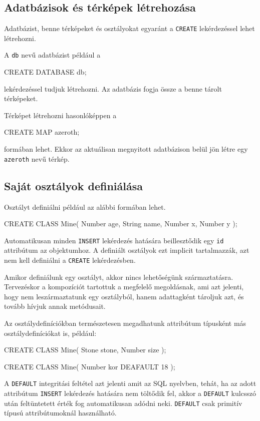 \subsection{Adatbázisok és térképek létrehozása}

Adatbázist, benne térképeket és osztályokat egyaránt a \texttt{CREATE} lekérdezéssel lehet létrehozni.

A \texttt{db} nevű adatbázist például a
\begin{sql}
CREATE DATABASE db;
\end{sql}
lekérdezéssel tudjuk létrehozni. Az adatbázis fogja össze a benne tárolt térképeket. 

Térképet létrehozni hasonlóképpen a
\begin{sql}
CREATE MAP azeroth;
\end{sql}
formában lehet. Ekkor az aktuálisan megnyitott adatbázison belül jön létre egy \texttt{azeroth} nevű térkép.

\subsection{Saját osztályok definiálása}

Osztályt definiálni például az alábbi formában lehet.
\begin{sql}
CREATE CLASS Mine(
    Number age,
    String name,
    Number x,
    Number y
); 
\end{sql}
Automatikusan minden \texttt{INSERT} lekérdezés hatására beillesztődik egy \texttt{id} attribútum az objektumhoz. A definiált osztályok ezt implicit tartalmazzák, azt nem kell definiálni a \texttt{CREATE} lekérdezésben.

Amikor definiálunk egy osztályt, akkor nincs lehetőségünk származtatásra. Tervezéskor a kompozíciót tartottuk a megfelelő megoldásnak, ami azt jelenti, hogy nem leszármaztatunk egy osztályból, hanem adattagként tároljuk azt, és tovább hívjuk annak metódusait.

Az osztálydefiníciókban természetesen megadhatunk attribútum típusként más osztálydefiníciókat is, például:
\begin{sql}
CREATE CLASS Mine(
    Stone stone,
    Number size
);

CREATE CLASS Mine(
	Number kor DEAFAULT 18
);
\end{sql}

A \texttt{DEFAULT} integritási feltétel azt jelenti amit az SQL nyelvben, tehát, ha az adott attribútum \texttt{INSERT} lekérdezés hatására nem töltődik fel, akkor a \texttt{DEFAULT} kulcsszó után feltüntetett érték fog automatikusan adódni neki. \texttt{DEFAULT} csak primitív típusú attribútumoknál használható.

